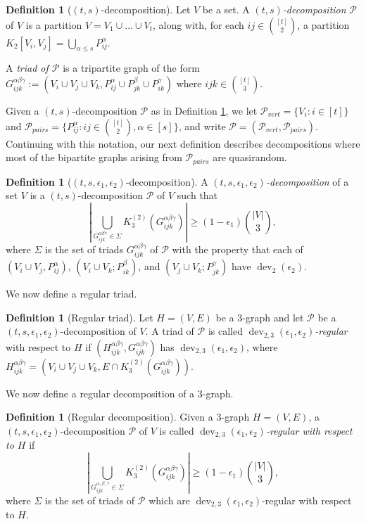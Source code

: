 \documentclass[12pt,oneside,british,a4wide]{amsart}
\numberwithin{equation}{section}
\theoremstyle{definition}
\newtheorem{definition}[theorem]{Definition}
\def\e{\epsilon}
\newcommand{\calP}{\mathcal{P}}
\def\dev{\operatorname{dev}}
\begin{document}
\begin{definition}[$(t,s)$-decomposition]\label{def:partn}
Let $V$ be a set. A \emph{$(t,s)$-decomposition} $\calP$ of $V$ is a partition $V=V_1\cup \ldots \cup V_t$, along with, for each $ij\in {[t]\choose 2}$, a partition $K_2[V_i, V_j]=\bigcup_{\alpha\leq s}P_{ij}^{\alpha}$.

A \emph{triad of $\calP$} is a tripartite graph of the form $G_{ijk}^{\alpha\beta\gamma}:=(V_i\cup V_j\cup V_k, P_{ij}^{\alpha}\cup P_{jk}^{\beta}\cup P_{ik}^{\gamma})$ where $ijk\in {[t]\choose 3}$.
\end{definition}

Given a $(t,s)$-decomposition $\calP$ as in Definition \ref{def:partn}, we let $\calP_{vert}=\{V_i: i\in [t]\}$ and $\calP_{pairs}=\{P_{ij}^{\alpha}: ij\in {[t]\choose 2}, \alpha\in [s]\}$, and write $\calP=(\calP_{vert},\calP_{pairs})$.  Continuing with this notation, our next definition describes decompositions where most of the bipartite graphs arising from $\calP_{pairs}$ are quasirandom.

\begin{definition}[$(t,s,\e_1,\e_2)$-decomposition]\label{def:partn2}
 A \emph{$(t,s,\e_1,\e_2)$-decomposition} of a set $V$ is a $(t,s)$-decomposition $\calP$ of $V$ such that
$$
|\bigcup_{G_{ijk}^{\alpha\beta\gamma}\in \Sigma}K_3^{(2)}(G_{ijk}^{\alpha\beta\gamma})|\geq (1-\e_1){|V|\choose 3},
$$ 
where $\Sigma$ is the set of triads $G_{ijk}^{\alpha\beta\gamma}$ of $\calP$ with the property that each of $(V_i\cup V_j, P_{ij}^{\alpha})$, $(V_i\cup V_k; P_{ik}^{\beta})$, and $(V_j\cup V_k; P_{jk}^{\gamma})$ have $\dev_2(\e_2)$.
\end{definition}

We now define a regular triad.

\begin{definition}[Regular triad]\label{def:regtriad}
Let $H=(V,E)$ be a $3$-graph and let $\calP$ be a $(t,s,\e_1,\e_2)$-decomposition of $V$.  A triad of $\calP$ is called \emph{$\dev_{2,3}(\e_1,\e_2)$-regular} with respect to $H$ if $(H_{ijk}^{\alpha\beta\gamma}, G_{ijk}^{\alpha\beta\gamma})$ has $\dev_{2,3}(\e_1,\e_2)$, where $H_{ijk}^{\alpha\beta\gamma}=(V_i\cup V_j\cup V_k, E\cap K_3^{(2)}(G_{ijk}^{\alpha\beta\gamma}))$.
\end{definition}

We now define a regular decomposition of a $3$-graph.

\begin{definition}[Regular decomposition]\label{def:regptn}
Given a $3$-graph $H=(V,E)$, a  $(t,s,\e_1,\e_2)$-decomposition $\calP$ of $V$ is called  \emph{$\dev_{2,3}(\e_1,\e_2)$-regular with respect to $H$} if
$$
|\bigcup_{G_{ijk}^{\alpha,\beta,\gamma}\in \Sigma}K_3^{(2)}(G_{ijk}^{\alpha\beta\gamma})|\geq (1-\e_1){|V|\choose 3},
$$
where $\Sigma$ is the set of triads of $\calP$ which are $\dev_{2,3}(\e_1,\e_2 )$-regular with respect to $H$. 
\end{definition}
\end{document}
